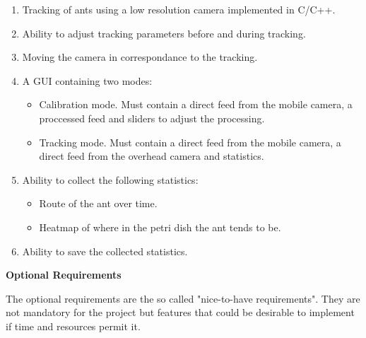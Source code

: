 \begin{enumerate}
    \item Tracking of ants using a low resolution camera implemented in C/C++.
    \item Ability to adjust tracking parameters before and during tracking.
    \item Moving the camera in correspondance to the tracking.
	\item A GUI containing two modes:
    \begin{itemize}
        \item Calibration mode. Must contain a direct feed from the mobile camera, a proccessed feed and sliders to adjust the processing.
        \item Tracking mode. Must contain a direct feed from the mobile camera, a direct feed from the overhead camera and statistics.
    \end{itemize}
    \item Ability to collect the following statistics:
    \begin{itemize}
        \item Route of the ant over time.
        \item Heatmap of where in the petri dish the ant tends to be.
    \end{itemize}
    \item Ability to save the collected statistics.
\end{enumerate}

\noindent \textbf{Optional Requirements} \par
The optional requirements are the so called "nice-to-have requirements". They are not mandatory for the project but features that could be desirable to implement if time and resources permit it.

